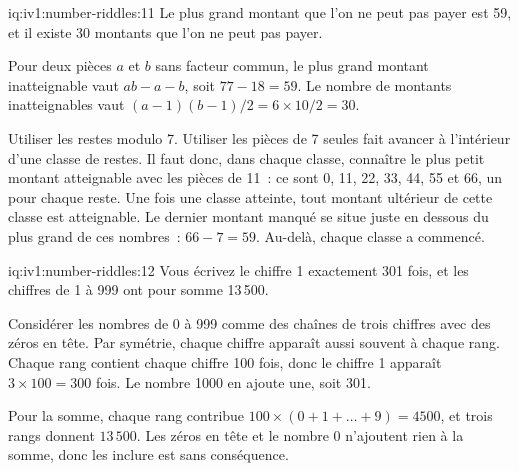 \begin{solution}{iq:iv1:number-riddles:11}
Le plus grand montant que l'on ne peut pas payer est 59, et il existe 30 montants que l'on ne peut pas payer.

Pour deux pièces $a$ et $b$ sans facteur commun, le plus grand montant inatteignable vaut $ab - a - b$, soit $77 - 18 = 59$. Le nombre de montants inatteignables vaut $(a - 1)(b - 1)/2 = 6 \times 10 / 2 = 30$.

Utiliser les restes modulo 7. Utiliser les pièces de 7 seules fait avancer à l'intérieur d'une classe de restes. Il faut donc, dans chaque classe, connaître le plus petit montant atteignable avec les pièces de 11~: ce sont 0, 11, 22, 33, 44, 55 et 66, un pour chaque reste. Une fois une classe atteinte, tout montant ultérieur de cette classe est atteignable. Le dernier montant manqué se situe juste en dessous du plus grand de ces nombres~: $66 - 7 = 59$. Au-delà, chaque classe a commencé.

\end{solution}

\begin{solution}{iq:iv1:number-riddles:12}
Vous écrivez le chiffre 1 exactement 301 fois, et les chiffres de 1 à 999 ont pour somme 13\,500.

Considérer les nombres de 0 à 999 comme des chaînes de trois chiffres avec des zéros en tête. Par symétrie, chaque chiffre apparaît aussi souvent à chaque rang. Chaque rang contient chaque chiffre 100 fois, donc le chiffre 1 apparaît $3 \times 100 = 300$ fois. Le nombre 1000 en ajoute une, soit 301.

Pour la somme, chaque rang contribue $100 \times (0 + 1 + \dots + 9) = 4500$, et trois rangs donnent $13\,500$. Les zéros en tête et le nombre 0 n'ajoutent rien à la somme, donc les inclure est sans conséquence.

\end{solution}

